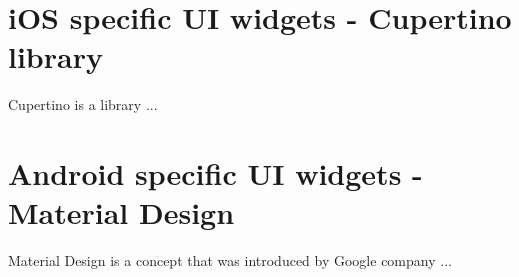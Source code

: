 



\section{iOS specific UI widgets - Cupertino library}\label{sec:ios-specific-ui-widgets}
Cupertino is a library ...


\section{Android specific UI widgets - Material Design}\label{sec:android-specific-ui-widgets}
Material Design is a concept that was introduced by Google company ...
